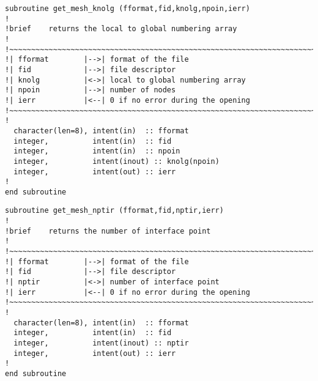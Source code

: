 %
\begin{lstlisting}
subroutine get_mesh_knolg (fformat,fid,knolg,npoin,ierr)
!
!brief    returns the local to global numbering array
!
!~~~~~~~~~~~~~~~~~~~~~~~~~~~~~~~~~~~~~~~~~~~~~~~~~~~~~~~~~~~~~~~~~~~~~~~
!| fformat        |-->| format of the file
!| fid            |-->| file descriptor
!| knolg          |<->| local to global numbering array
!| npoin          |-->| number of nodes
!| ierr           |<--| 0 if no error during the opening
!~~~~~~~~~~~~~~~~~~~~~~~~~~~~~~~~~~~~~~~~~~~~~~~~~~~~~~~~~~~~~~~~~~~~~~~
!
  character(len=8), intent(in)  :: fformat
  integer,          intent(in)  :: fid
  integer,          intent(in)  :: npoin
  integer,          intent(inout) :: knolg(npoin)
  integer,          intent(out) :: ierr
!
end subroutine
\end{lstlisting}
%
\begin{lstlisting}
subroutine get_mesh_nptir (fformat,fid,nptir,ierr)
!
!brief    returns the number of interface point
!
!~~~~~~~~~~~~~~~~~~~~~~~~~~~~~~~~~~~~~~~~~~~~~~~~~~~~~~~~~~~~~~~~~~~~~~~
!| fformat        |-->| format of the file
!| fid            |-->| file descriptor
!| nptir          |<->| number of interface point
!| ierr           |<--| 0 if no error during the opening
!~~~~~~~~~~~~~~~~~~~~~~~~~~~~~~~~~~~~~~~~~~~~~~~~~~~~~~~~~~~~~~~~~~~~~~~
!
  character(len=8), intent(in)  :: fformat
  integer,          intent(in)  :: fid
  integer,          intent(inout) :: nptir
  integer,          intent(out) :: ierr
!
end subroutine
\end{lstlisting}
%
